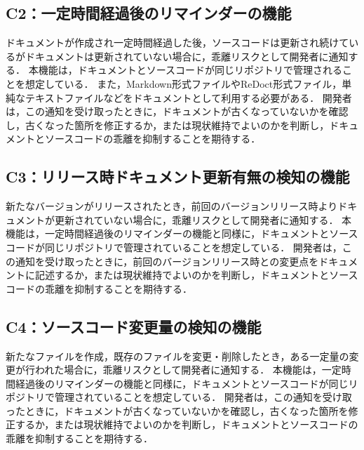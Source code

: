 \subsection{C2：一定時間経過後のリマインダーの機能}
ドキュメントが作成され一定時間経過した後，ソースコードは更新され続けているがドキュメントは更新されていない場合に，乖離リスクとして開発者に通知する．
本機能は，ドキュメントとソースコードが同じリポジトリで管理されることを想定している．
また，Markdown形式ファイルやReDoct形式ファイル，単純なテキストファイルなどをドキュメントとして利用する必要がある．
開発者は，この通知を受け取ったときに，ドキュメントが古くなっていないかを確認し，古くなった箇所を修正するか，または現状維持でよいのかを判断し，ドキュメントとソースコードの乖離を抑制することを期待する．

\subsection{C3：リリース時ドキュメント更新有無の検知の機能}
新たなバージョンがリリースされたとき，前回のバージョンリリース時よりドキュメントが更新されていない場合に，乖離リスクとして開発者に通知する．
本機能は，一定時間経過後のリマインダーの機能と同様に，ドキュメントとソースコードが同じリポジトリで管理されていることを想定している．
開発者は，この通知を受け取ったときに，前回のバージョンリリース時との変更点をドキュメントに記述するか，または現状維持でよいのかを判断し，ドキュメントとソースコードの乖離を抑制することを期待する．

\subsection{C4：ソースコード変更量の検知の機能}
新たなファイルを作成，既存のファイルを変更・削除したとき，ある一定量の変更が行われた場合に，乖離リスクとして開発者に通知する．
本機能は，一定時間経過後のリマインダーの機能と同様に，ドキュメントとソースコードが同じリポジトリで管理されていることを想定している．
開発者は，この通知を受け取ったときに，ドキュメントが古くなっていないかを確認し，古くなった箇所を修正するか，または現状維持でよいのかを判断し，ドキュメントとソースコードの乖離を抑制することを期待する．